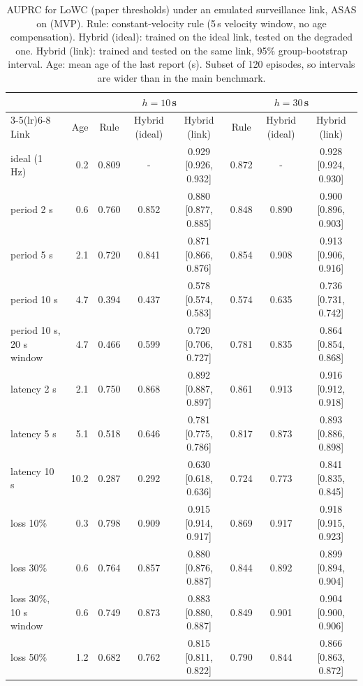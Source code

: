 \begin{table}[t]
\centering\small
\caption{AUPRC for LoWC (paper thresholds) under an emulated surveillance link, ASAS on (MVP). Rule: constant-velocity rule (5\,s velocity window, no age compensation). Hybrid (ideal): trained on the ideal link, tested on the degraded one. Hybrid (link): trained and tested on the same link, 95\% group-bootstrap interval. Age: mean age of the last report (s). Subset of 120 episodes, so intervals are wider than in the main benchmark.}\label{tab:link_mvp}
\begin{tabular}{lrcccccc}
\toprule
 & & \multicolumn{3}{c}{$h=10$\,s} & \multicolumn{3}{c}{$h=30$\,s} \\
\cmidrule(lr){3-5}\cmidrule(lr){6-8}
Link & Age & Rule & Hybrid (ideal) & Hybrid (link) & Rule & Hybrid (ideal) & Hybrid (link) \\
\midrule
ideal (1 Hz) & 0.2 & 0.809 & - & 0.929 [0.926, 0.932] & 0.872 & - & 0.928 [0.924, 0.930] \\
period 2 s & 0.6 & 0.760 & 0.852 & 0.880 [0.877, 0.885] & 0.848 & 0.890 & 0.900 [0.896, 0.903] \\
period 5 s & 2.1 & 0.720 & 0.841 & 0.871 [0.866, 0.876] & 0.854 & 0.908 & 0.913 [0.906, 0.916] \\
period 10 s & 4.7 & 0.394 & 0.437 & 0.578 [0.574, 0.583] & 0.574 & 0.635 & 0.736 [0.731, 0.742] \\
period 10 s, 20 s window & 4.7 & 0.466 & 0.599 & 0.720 [0.706, 0.727] & 0.781 & 0.835 & 0.864 [0.854, 0.868] \\
latency 2 s & 2.1 & 0.750 & 0.868 & 0.892 [0.887, 0.897] & 0.861 & 0.913 & 0.916 [0.912, 0.918] \\
latency 5 s & 5.1 & 0.518 & 0.646 & 0.781 [0.775, 0.786] & 0.817 & 0.873 & 0.893 [0.886, 0.898] \\
latency 10 s & 10.2 & 0.287 & 0.292 & 0.630 [0.618, 0.636] & 0.724 & 0.773 & 0.841 [0.835, 0.845] \\
loss 10\% & 0.3 & 0.798 & 0.909 & 0.915 [0.914, 0.917] & 0.869 & 0.917 & 0.918 [0.915, 0.923] \\
loss 30\% & 0.6 & 0.764 & 0.857 & 0.880 [0.876, 0.887] & 0.844 & 0.892 & 0.899 [0.894, 0.904] \\
loss 30\%, 10 s window & 0.6 & 0.749 & 0.873 & 0.883 [0.880, 0.887] & 0.849 & 0.901 & 0.904 [0.900, 0.906] \\
loss 50\% & 1.2 & 0.682 & 0.762 & 0.815 [0.811, 0.822] & 0.790 & 0.844 & 0.866 [0.863, 0.872] \\
\bottomrule
\end{tabular}
\end{table}

